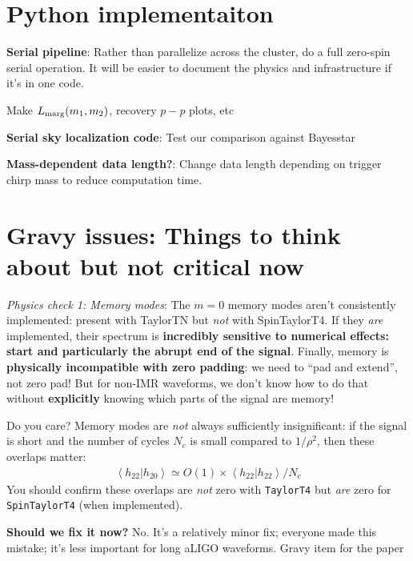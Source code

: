 \documentclass[twocolumn,prd,nofootinbib]{revtex4}
\newcommand\editremark[1]{{\color{red} #1}}
\newcommand\qmstateproduct[2]{\left\langle#1|#2\right\rangle}
\begin{document}
\section{Python implementaiton}

\noindent \textbf{Serial pipeline}: Rather than parallelize across the cluster, do a full zero-spin serial operation.
It will be easier to document the physics and infrastructure if it's in one code.

Make $L_{\rm marg}(m_1,m_2)$, recovery $p-p$ plots, etc

\noindent \textbf{Serial sky localization code}: Test our comparison against Bayesstar

\noindent \textbf{Mass-dependent data length?}: Change data length depending on trigger chirp mass to reduce computation time.



\appendix
\section{Gravy issues: Things to think about but not critical now}

\emph{Physics check 1: Memory modes}: The $m=0$ memory modes \cite{2009PhRvD..80b4002F,2009ApJ...696L.159F,2010CQGra..27h4036F,2011PhRvD..84l4013F} aren't consistently implemented: present with
  TaylorTN but \emph{not} with SpinTaylorT4.   If they \emph{are}
  implemented, their spectrum is \textbf{incredibly sensitive to numerical effects: start and particularly the abrupt
    end of the signal}.  Finally, memory is \textbf{physically incompatible with zero padding}: we need to ``pad and
  extend'', not zero pad!    But for non-IMR waveforms, we don't know how to do that without \textbf{explicitly} knowing
  which parts of the signal are memory!

Do you care?  Memory modes are \emph{not} always sufficiently insignificant: if the signal is short and the number of cycles
$N_{c}$ is small compared to $1/\rho^2$, then these overlaps matter:
\begin{eqnarray}
\qmstateproduct{h_{22}}{h_{20}} \simeq O(1) \times \qmstateproduct{h_{22}}{h_{22}}/N_c 
\end{eqnarray}
You should confirm these overlaps are \emph{not} zero with \texttt{TaylorT4} but \emph{are} zero for
\texttt{SpinTaylorT4} (when implemented).

\textbf{Should we fix it now?} No.  It's a relatively minor fix; everyone made this mistake; it's less important for
long aLIGO waveforms. \editremark{Gravy item for the paper}
\end{document}
